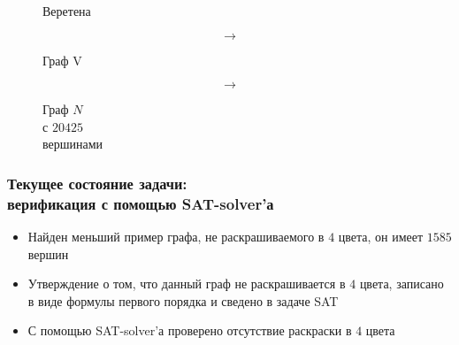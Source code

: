 \documentclass[14pt]{beamer}
\begin{document}
\begin{frame}
\begin{figure}[h]
\begin{minipage}[h]{0.2\linewidth}
    Веретена
  \end{minipage}
  \begin{minipage}[h]{0.03\linewidth}
  \vspace{-1cm}$$\to $$
  \end{minipage}
  \begin{minipage}[h]{0.2\linewidth}
    Граф V
  \end{minipage}
  \begin{minipage}[h]{0.03\linewidth}
  \vspace{-1cm}$$\to $$
  \end{minipage}
  \hfill
  \begin{minipage}[h]{0.2\linewidth}
  {\small Граф $N$ \\ с $20425$ \\  вершинами}
  \end{minipage}
\end{figure}
\end{frame}

\begin{frame}
\frametitle{Текущее состояние задачи: \\ верификация с помощью SAT-solver'а}
\begin{itemize}
    \item Найден меньший пример графа, не раскрашиваемого в $4$ цвета, он имеет $1585$ вершин
    \item Утверждение о том, что данный граф не раскрашивается в $4$ цвета, записано в виде формулы первого порядка и сведено в задаче SAT
    \item С помощью SAT-solver'а проверено отсутствие раскраски в $4$ цвета
\end{itemize}
\end{frame}
\end{document}

